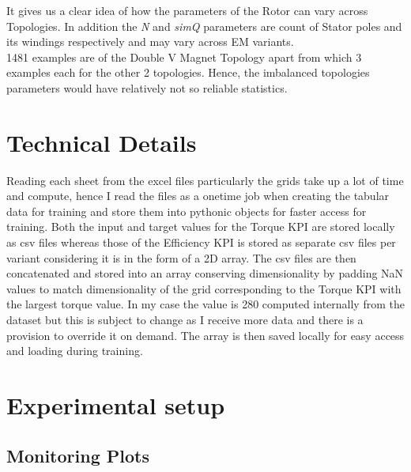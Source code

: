 \documentclass{report} %
\begin{document}
It gives us a clear idea of how the parameters of the Rotor can vary across Topologies.
In addition the \textit{N} and \textit{simQ} parameters are count of Stator poles and its windings respectively and may vary across \ac{EM} variants.\\
1481 examples are of the Double V Magnet Topology apart from which 3 examples each for the other 2 topologies.
Hence, the imbalanced topologies parameters would have relatively not so reliable statistics.\\ 

\section{Technical Details}

Reading each sheet from the excel files particularly the grids take up a lot of time and compute, hence I read the files as a onetime job when creating the 
tabular data for training  and store them into pythonic objects for faster access for training.
Both the input and target values for the Torque \ac{KPI} are stored locally as csv files whereas those of the Efficiency \ac{KPI} is stored as separate csv files per 
variant considering it is in the form of a 2\ac{D} array.
The csv files are then concatenated and stored into an array conserving dimensionality by padding \ac{NaN} values to match dimensionality of the grid 
corresponding to the Torque \ac{KPI} with the largest torque value.
In my case the value is 280 computed internally from the dataset but this is subject to change as I receive more data and there is a provision to override it 
on demand. The array is then saved locally for easy access and loading during training.

\section{Experimental setup}
\label{sec:Experimental setup}

\subsection{Monitoring Plots}
\label{subsec:Monitoring Plots}
\end{document}
